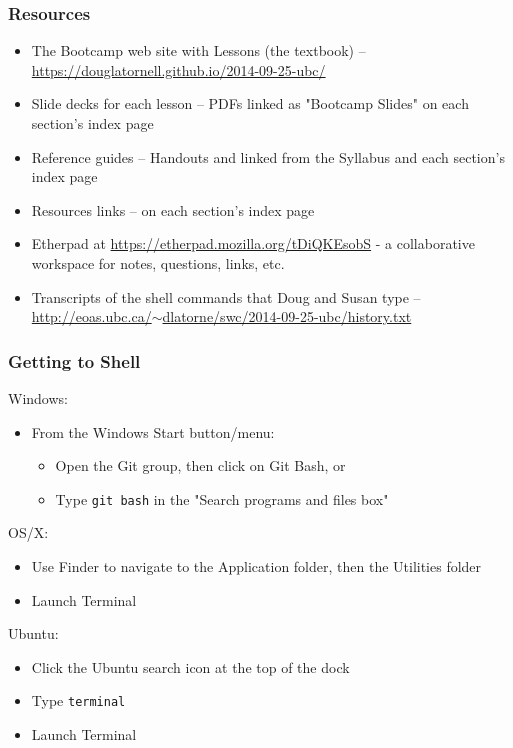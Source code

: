 \documentclass[xcolor=dvipsnames]{beamer}
\begin{document}
\begin{frame}
\frametitle{Resources}
\begin{itemize}
\item The Bootcamp web site with Lessons (the textbook) -- \href{https://douglatornell.github.io/2014-09-25-ubc/}{https://douglatornell.github.io/2014-09-25-ubc/}
\item Slide decks for each lesson -- PDFs linked as "Bootcamp Slides" on each section's index page
\item Reference guides -- Handouts and linked from the Syllabus and each section's index page
\item Resources links -- on each section's index page
\item Etherpad at \href{https://etherpad.mozilla.org/tDiQKEsobS}{https://etherpad.mozilla.org/tDiQKEsobS} - a collaborative workspace for notes, questions, links, etc.
\item Transcripts of the shell commands that Doug and Susan type -- \href{http://eoas.ubc.ca/~dlatorne/swc/2014-09-25-ubc/history.txt}{http://eoas.ubc.ca/$\sim$dlatorne/swc/2014-09-25-ubc/history.txt}
\end{itemize}
\end{frame}

\begin{frame}
\frametitle{Getting to Shell}
Windows:
\begin{itemize}
    \item From the Windows Start button/menu:
    \begin{itemize}
        \item Open the Git group, then click on Git Bash, or
        \item Type {\tt git bash} in the "Search programs and files box"
    \end{itemize}
\end{itemize}

OS/X:
\begin{itemize}
    \item Use Finder to navigate to the Application folder, then the Utilities folder
    \item Launch Terminal
\end{itemize}

Ubuntu:
\begin{itemize}
    \item Click the Ubuntu search icon at the top of the dock
    \item Type {\tt terminal}
    \item Launch Terminal
\end{itemize}

\end{frame}
\end{document}
